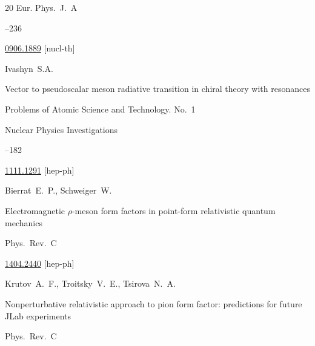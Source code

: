 \begin{thebibliography}{20}
\jour Eur. Phys.~J.~A




--236

\arxiv \href{http://arxiv.org/abs/0906.1889}{0906.1889} [nucl-th]







\by Ivashyn~S.A.

\paper    Vector to pseudoscalar meson radiative transition in chiral theory with resonances

\inbook Problems of Atomic Science and Technology. \rm No.~1

\serial Nuclear Physics Investigations 



--182

\arxiv \href{http://arxiv.org/abs/1111.1291}{1111.1291} [hep-ph]




\by  Bierrat~E.~P., Schweiger~W.

\paper  Electromagnetic $\rho$-meson form factors in point-form relativistic quantum mechanics

\jour  Phys.~Rev.~C






\arxiv \href{http://arxiv.org/abs/1404.2440}{1404.2440} [hep-ph]








\by Krutov~A.~F., Troitsky~V.~E., Tsirova~N.~A.

\paper  Nonperturbative relativistic approach to pion form factor: predictions for future JLab experiments

\jour Phys.~Rev.~C





\end{thebibliography}

